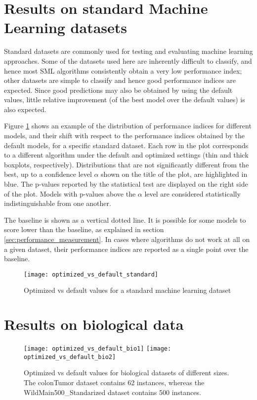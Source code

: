 \section{Results on standard Machine Learning datasets}

Standard datasets are commonly used for testing and evaluating machine learning approaches. Some of
the datasets used here are inherently difficult to classify, and hence most SML algorithms
consistently obtain a very low performance index; other datasets are simple to classify and hence
good performance indices are expected. Since good predictions may also be obtained by using the
default values, little relative improvement (of the best model over the default values) is also
expected.

Figure \ref{img:optvsdefstandard} shows an example of the distribution of performance indices for
different models, and their shift with respect to the performance indices obtained by the default
models, for a specific standard dataset. Each row in the plot corresponds to a different algorithm
under the default and optimized settings (thin and thick boxplots, respectively). Distributions that
are not significantly different from the best, up to a confidence level $\alpha$ shown on the title of the
plot, are highlighted in blue. The p-values reported by the statistical test are displayed on the right side
of the plot. Models with p-values above the $\alpha$ level are considered statistically
indistinguishable from one another.

The baseline is shown as a vertical dotted line. It is possible for some models to score lower than the
baseline, as explained in section \ref{sec:performance_measurement}. In cases where algorithms do
not work at all on a given dataset, their performance indices are reported as a single point over
the baseline.

\begin{figure}[t!]
	\centering
	\texttt{[image: optimized\_vs\_default\_standard]}
	\caption{Optimized vs default values for a standard machine learning dataset}
	\label{img:optvsdefstandard}
\end{figure}


\section{Results on biological data}

\begin{figure}[h!]
	\centering
	\texttt{[image: optimized\_vs\_default\_bio1]}
	\texttt{[image: optimized\_vs\_default\_bio2]}
	\caption[Optimized vs default values for biological datasets of different sizes]{Optimized vs
	default values for biological datasets of different sizes. The colonTumor dataset contains 62
	instances, whereas the WildMain500\_Standarized dataset contains 500 instances.}
	\label{img:optvsdefbio}
\end{figure}

